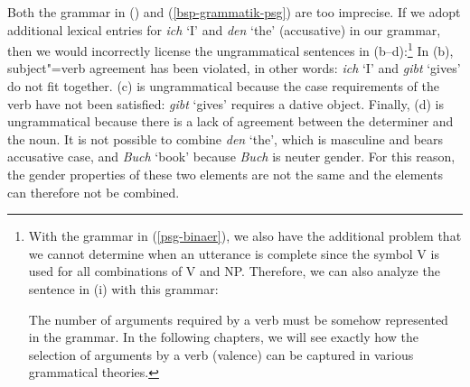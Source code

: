 Both the grammar in () and (\ref{bsp-grammatik-psg}) are too imprecise.
If we adopt additional lexical entries for \emph{ich} `I' and \emph{den} `the' (accusative) in our grammar, then we would incorrectly
license the ungrammatical sentences in (b--d):\footnote{%
	With the grammar in (\ref{psg-binaer}), we also have the additional problem that we cannot determine when an utterance is complete
	since the symbol V is used for all combinations of V and NP. Therefore, we can also analyze the sentence in (i) with this grammar:
  
\eal
{}
\zl
The number of arguments required by a verb must be somehow represented in the grammar. In the following chapters, we will see exactly
how the selection of arguments by a verb (valence) can be captured in various grammatical theories.
}
\eal
{}
\zl
In (b), subject"=verb agreement has been violated, in other words: \emph{ich} `I' and \emph{gibt} `gives' do not fit together.
(c) is ungrammatical because the case requirements of the verb have not been satisfied: \emph{gibt} `gives' requires a dative object. Finally, (d) is ungrammatical
because there is a lack of agreement between the determiner and the noun. It is not possible to combine \emph{den} `the', which is masculine and bears accusative case, 
and \emph{Buch} `book' because \emph{Buch} is neuter gender. For this reason, the gender properties
of these two elements are not the same and the elements can therefore not be combined.

